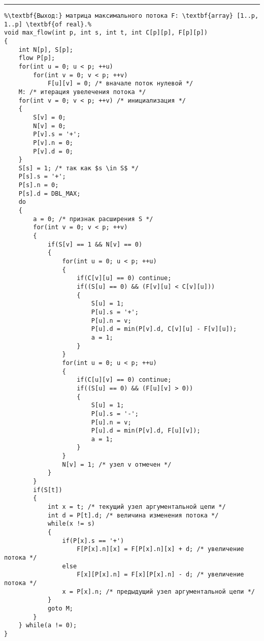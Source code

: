 \documentclass{article}
\begin{document}
\vspace{5pt} \hrule
\begin{lstlisting}[caption={Нахождение максимального потока}, label=p279_max_flow, escapechar=\%]
%\noindent\textbf{Вход:} сеть G(V, E) с источником s и стоком t, заданная матрицей пропускных способностей C: \textbf{array} [1..p, 1..p] \textbf{of real}.\\%
%\textbf{Выход:} матрица максимального потока F: \textbf{array} [1..p, 1..p] \textbf{of real}.%
void max_flow(int p, int s, int t, int C[p][p], F[p][p])
{
	int N[p], S[p];
	flow P[p];
	for(int u = 0; u < p; ++u)
		for(int v = 0; v < p; ++v)
			F[u][v] = 0; /* вначале поток нулевой */
	M: /* итерация увелечения потока */
	for(int v = 0; v < p; ++v) /* инициализация */
	{
		S[v] = 0;
		N[v] = 0;
		P[v].s = '+';
		P[v].n = 0;
		P[v].d = 0;
	}
	S[s] = 1; /* так как $s \in S$ */
	P[s].s = '+';
	P[s].n = 0;
	P[s].d = DBL_MAX;
	do
	{
		a = 0; /* признак расширения S */
		for(int v = 0; v < p; ++v)
		{
			if(S[v] == 1 && N[v] == 0)
			{
				for(int u = 0; u < p; ++u)
				{
					if(C[v][u] == 0) continue;
					if((S[u] == 0) && (F[v][u] < C[v][u]))
	  				{
						S[u] = 1;
						P[u].s = '+';
						P[u].n = v;
						P[u].d = min(P[v].d, C[v][u] - F[v][u]);
						a = 1;
					}
				}
				for(int u = 0; u < p; ++u)
				{
					if(C[u][v] == 0) continue;
					if((S[u] == 0) && (F[u][v] > 0))
					{
						S[u] = 1;
						P[u].s = '-';
						P[u].n = v;
						P[u].d = min(P[v].d, F[u][v]);
						a = 1;
					}
				}
				N[v] = 1; /* узел v отмечен */
			}
		}
		if(S[t])
		{
			int x = t; /* текущий узел аргументальной цепи */
			int d = P[t].d; /* величина изменения потока */
			while(x != s)
			{
				if(P[x].s == '+')
					F[P[x].n][x] = F[P[x].n][x] + d; /* увеличение потока */
				else
					F[x][P[x].n] = F[x][P[x].n] - d; /* увеличение потока */
				x = P[x].n; /* предыдущий узел аргументальной цепи */
			}
			goto M;
		}
	} while(a != 0);
}
\end{lstlisting}
\end{document}
